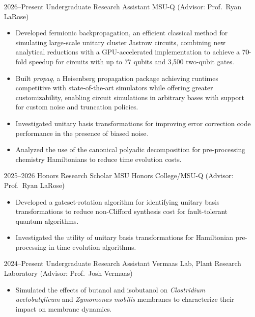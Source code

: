 \documentclass[9pt]{developercv} %
\begin{document}
\begin{entrylist}
	\entry 
	{2026--Present}
	{Undergraduate Research Assistant} 
	{MSU-Q \textmd{(Advisor: Prof.~Ryan LaRose)}}
	{\vspace{-10pt}
	\begin{itemize}[noitemsep,topsep=0pt,parsep=0pt,partopsep=0pt, leftmargin=7pt]
		\item Developed fermionic backpropagation, an efficient classical method for simulating large-scale unitary cluster Jastrow circuits, combining new analytical
		reductions with a GPU-accelerated implementation to achieve a 70-fold speedup for circuits with up to 77 qubits and 3,500 two-qubit gates.
		\item Built \textit{propaq}, a Heisenberg propagation package achieving runtimes competitive with state-of-the-art simulators while offering greater customizability, enabling circuit simulations in arbitrary bases with support for custom noise and truncation policies.
		\item Investigated unitary basis transformations for improving error correction code performance in the presence of biased noise.
		\item Analyzed the use of the canonical polyadic decomposition for pre-processing chemistry Hamiltonians to reduce time evolution costs.
	\end{itemize}
	}
	\entry
	{2025--2026}
	{Honors Research Scholar}
	{MSU Honors College/MSU-Q \textmd{(Advisor: Prof.~Ryan LaRose)}}
	{\vspace{-10pt}
	\begin{itemize}[noitemsep,topsep=0pt,parsep=0pt,partopsep=0pt, leftmargin=7pt]
	\item Developed a gateset-rotation algorithm for identifying unitary basis transformations to reduce non-Clifford synthesis cost for fault-tolerant quantum algorithms.
	\item Investigated the utility of unitary basis transformations for Hamiltonian pre-processing in time evolution algorithms.
	\end{itemize}
	}
	\entry 
		{2024--Present}
		{Undergraduate Research Assistant}
		{Vermaas Lab, Plant Research Laboratory \textmd{(Advisor: Prof.~Josh Vermaas)}}
		{\vspace{-10pt}
		\begin{itemize}[noitemsep,topsep=0pt,parsep=0pt,partopsep=0pt, leftmargin=7pt]
			\item Simulated the effects of butanol and isobutanol on \textit{Clostridium acetobutylicum} and \textit{Zymomonas mobilis} membranes to characterize their impact on membrane dynamics.

\end{itemize}}
\end{entrylist}
\end{document}
